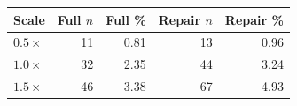 \begin{tabular}{lrrrr}
\toprule
Scale & Full $n$ & Full \% & Repair $n$ & Repair \% \\
\midrule
$0.5\times$ & 11 & 0.81 & 13 & 0.96 \\
$\mathbf{1.0\times}$ & 32 & 2.35 & 44 & 3.24 \\
$1.5\times$ & 46 & 3.38 & 67 & 4.93 \\
\bottomrule
\end{tabular}
